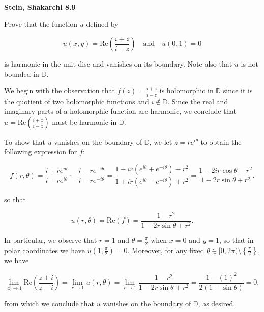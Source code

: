 \newcommand{\argz}[1][]{e^{#1 i \theta}}

\textbf{Stein, Shakarchi 8.9}

Prove that the function $u$ defined by

$$
u(x, y) = \text{Re} \left( \frac{i + z}{i - z} \right) \quad \text{and} \quad u(0, 1) = 0
$$

is harmonic in the unit disc and vanishes on its boundary. Note also that $u$ is not bounded in $\mathbb{D}$.

\begin{solution}
  We begin with the observation that $f(z) = \frac{i + z}{i - z}$ is holomorphic in $\mathbb{D}$ since it is the 
  quotient of two holomorphic functions and $i \notin \mathbb{D}$. Since the real and imaginary parts of a holomorphic 
  function are harmonic, we conclude that $u = \text{Re} \left( \frac{i + z}{i - z} \right)$ must be harmonic in 
  $\mathbb{D}$.

  To show that $u$ vanishes on the boundary of $\mathbb{D}$, we let $z = r \argz$ to obtain the following expression for 
  $f$:

  $$
  f(r, \theta) = \frac{i + r \argz}{i - r \argz} \cdot \frac{-i - r \argz[-]}{-i - r \argz[-]} 
               = \frac{1 - ir\left(\argz + \argz[-]\right) - r^2}{1 + ir \left(\argz - \argz[-] \right) + r^2}
               = \frac{1 - 2ir \cos{\theta} - r^2}{1 - 2r \sin{\theta} + r^2}.
  $$

  so that

  $$
  u(r, \theta) = \text{Re} (f) = \frac{1 - r^2}{1 - 2r \sin{\theta} + r^2}.
  $$

  In particular, we observe that $r = 1$ and $\theta = \frac{\pi}{2}$ when $x = 0$ and $y = 1$, so that in polar 
  coordinates we have $u\left(1, \frac{\pi}{2}\right) = 0$. Moreover, for any fixed $\theta \in [0, 2 \pi) \setminus \left\{ \frac{\pi}{2} \right\}$, we have

  $$
  \lim_{|z| \to 1} \text{Re} \left(\frac{z + i}{z - i}\right) = \lim_{r \to 1} u(r, \theta) 
                                                              = \lim_{r \to 1} \frac{1 - r^2}{1 - 2r \sin{\theta} + r^2} 
                                                              = \frac{1 - (1)^2}{2(1 - \sin{\theta})} 
                                                              = 0,
  $$

  from which we conclude that $u$ vanishes on the boundary of $\mathbb{D}$, as desired.
  \ \\
\end{solution}
